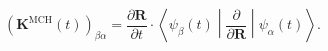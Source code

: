 \documentclass{article}
\renewcommand{\vec}[1]{\ensuremath{\mathbf{#1}}}
\begin{document}
\begin{equation}
  \left(\vec{K}^{\text{MCH}}(t)\right)_{\beta\alpha}
  =
  \frac{\partial \vec{R}}{\partial t}\cdot
  \left\langle
    \psi_\beta(t)
  \middle|
    \frac{\partial}{\partial \vec{R}}
  \middle|
    \psi_\alpha(t)
  \right\rangle.
  \
\nonumber\end{equation}
\end{document}
